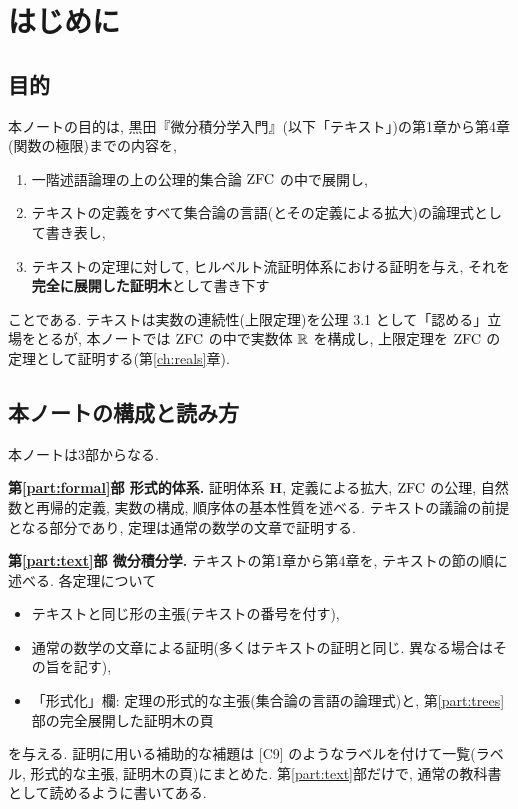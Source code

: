\chapter{はじめに}\label{ch:intro}

\section{目的}

本ノートの目的は, 黒田『微分積分学入門』\cite{kuroda}(以下「テキスト」)の第1章から第4章(関数の極限)までの内容を,
\begin{enumerate}[label=(\arabic*)]
  \item 一階述語論理の上の公理的集合論 $\mathrm{ZFC}$ の中で展開し,
  \item テキストの定義をすべて集合論の言語(とその定義による拡大)の論理式として書き表し,
  \item テキストの定理に対して, ヒルベルト流証明体系における証明を与え, それを\textbf{完全に展開した証明木}として書き下す
\end{enumerate}
ことである. テキストは実数の連続性(上限定理)を公理 3.1 として「認める」立場をとるが, 本ノートでは $\mathrm{ZFC}$ の中で実数体 $\mathbb{R}$ を構成し, 上限定理を $\mathrm{ZFC}$ の定理として証明する(第\ref{ch:reals}章).

\section{本ノートの構成と読み方}

本ノートは3部からなる.

\medskip\noindent\textbf{第\ref{part:formal}部 形式的体系.}\quad
証明体系 $\mathbf{H}$, 定義による拡大, $\mathrm{ZFC}$ の公理, 自然数と再帰的定義, 実数の構成, 順序体の基本性質を述べる. テキストの議論の前提となる部分であり, 定理は通常の数学の文章で証明する.

\medskip\noindent\textbf{第\ref{part:text}部 微分積分学.}\quad
テキストの第1章から第4章を, テキストの節の順に述べる. 各定理について
\begin{itemize}
  \item テキストと同じ形の主張(テキストの番号を付す),
  \item 通常の数学の文章による証明(多くはテキストの証明と同じ. 異なる場合はその旨を記す),
  \item 「形式化」欄: 定理の形式的な主張(集合論の言語の論理式)と, 第\ref{part:trees}部の完全展開した証明木の頁
\end{itemize}
を与える. 証明に用いる補助的な補題は [C9] のようなラベルを付けて一覧(ラベル, 形式的な主張, 証明木の頁)にまとめた. 第\ref{part:text}部だけで, 通常の教科書として読めるように書いてある.

